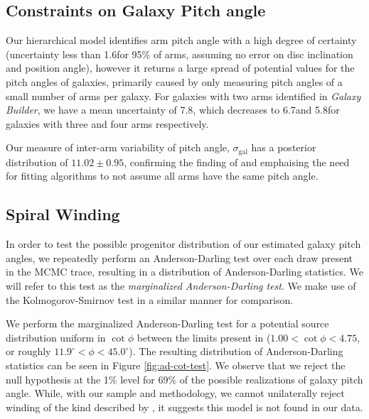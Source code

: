 \subsection{Constraints on Galaxy Pitch angle}
Our hierarchical model identifies arm pitch angle with a high degree of certainty (uncertainty less than 1.6\degree for 95\% of arms, assuming no error on disc inclination and position angle), however it returns a large spread of potential values for the pitch angles of galaxies, primarily caused by only measuring pitch angles of a small number of arms per galaxy. For galaxies with two arms identified in \textit{Galaxy Builder}, we have a mean uncertainty of 7.8\degree, which decreases to 6.7\degree and 5.8\degree for galaxies with three and four arms respectively.

Our measure of inter-arm variability of pitch angle, $\sigma_\mathrm{gal}$ has a posterior distribution of $11.02 \pm 0.95$, confirming the finding of \citet{2014ApJ...790...87D} and emphaising the need for fitting algorithms to not assume all arms have the same pitch angle.

\subsection{Spiral Winding}
\label{section:spiral_winding}
In order to test the possible progenitor distribution of our estimated galaxy pitch angles, we repeatedly perform an Anderson-Darling test over each draw present in the MCMC trace, resulting in a distribution of Anderson-Darling statistics. We will refer to this test as the \textit{marginalized Anderson-Darling test}. We make use of the Kolmogorov-Smirnov test in a similar manner for comparison.

We perform the marginalized Anderson-Darling test for a potential source distribution uniform in $\cot\phi$ between the limits present in \citet{2019arXiv190910291P} ($1.00 < \cot\phi < 4.75$, or roughly $11.9^\circ < \phi < 45.0^\circ$). The resulting distribution of Anderson-Darling statistics can be seen in Figure \ref{fig:ad-cot-test}. We observe that we reject the null hypothesis at the 1\% level for 69\% of the possible realizations of galaxy pitch angle. While, with our sample and methodology, we cannot unilaterally reject winding of the kind described by \citet{2019arXiv190910291P}, it suggests this model is not found in our data.

